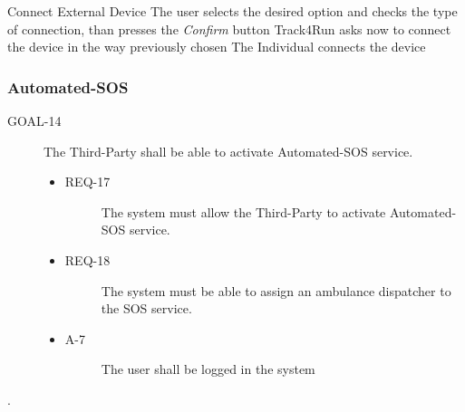 \documentclass[a4paper]{article}
\newcommand{\requirement}{\ding{229}}%
\begin{document}
        
        \begin{usecase}{Connect External Device}
        {The user selects the desired option and checks the type of connection, than presses the \textit{Confirm} button}
        {Track4Run asks now to connect the device in the way previously chosen}
        {The Individual connects the device}
        \end{usecase}
        
        
        
        \subsubsection{Automated-SOS }
        
         \begin{description}
        	\item[GOAL-14] The Third-Party shall be able to activate Automated-SOS service.
            	\begin{itemize}
            	    \item[\requirement]
                	\begin{description}
                	\item[REQ-17] The system must allow the Third-Party to activate Automated-SOS service.
                	\end{description}
                	\item[\requirement]
                	\begin{description}
                	\item[REQ-18] The system must be able to assign an ambulance dispatcher to the SOS service.
                	\end{description}
                	\item
                	\begin{description}
                	\item[A-7] The user shall be logged in the system
                	\end{description}
                	\end{itemize}
        \end{description}.
        
\end{document}
